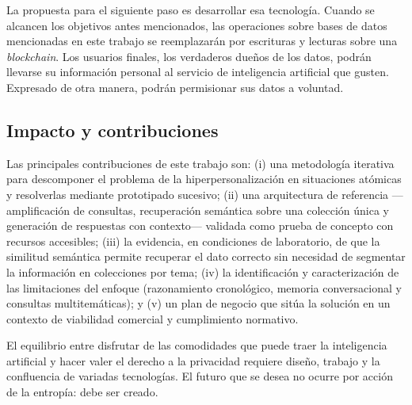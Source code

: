 La propuesta para el siguiente paso es desarrollar esa tecnología. Cuando se alcancen los objetivos antes mencionados, las operaciones sobre bases de datos mencionadas en este trabajo se reemplazarán por escrituras y lecturas sobre una \textit{blockchain}. Los usuarios finales, los verdaderos dueños de los datos, podrán llevarse su información personal al servicio de inteligencia artificial que gusten. Expresado de otra manera, podrán permisionar sus datos a voluntad.

\subsection{Impacto y contribuciones}

Las principales contribuciones de este trabajo son: (i) una metodología iterativa para descomponer el problema de la hiperpersonalización en situaciones atómicas y resolverlas mediante prototipado sucesivo; (ii) una arquitectura de referencia —amplificación de consultas, recuperación semántica sobre una colección única y generación de respuestas con contexto— validada como prueba de concepto con recursos accesibles; (iii) la evidencia, en condiciones de laboratorio, de que la similitud semántica permite recuperar el dato correcto sin necesidad de segmentar la información en colecciones por tema; (iv) la identificación y caracterización de las limitaciones del enfoque (razonamiento cronológico, memoria conversacional y consultas multitemáticas); y (v) un plan de negocio que sitúa la solución en un contexto de viabilidad comercial y cumplimiento normativo.

El equilibrio entre disfrutar de las comodidades que puede traer la inteligencia artificial y hacer valer el derecho a la privacidad requiere diseño, trabajo y la confluencia de variadas tecnologías. El futuro que se desea no ocurre por acción de la entropía: debe ser creado.

